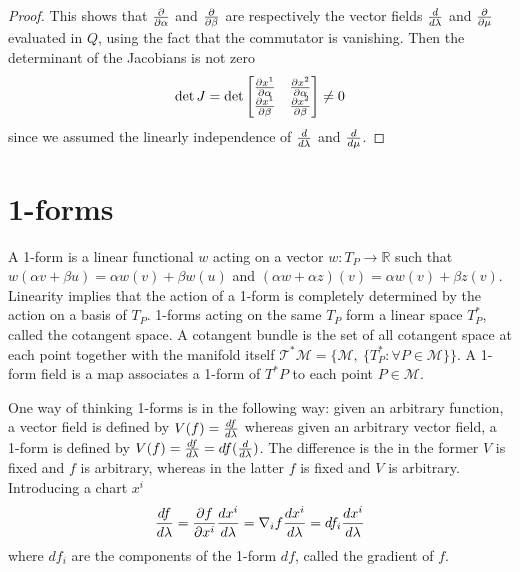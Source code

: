 \begin{proof}
    This shows that $\frac{\partial}{\partial\alpha}$ and $\frac{\partial}{\partial\beta}$ are respectively the vector fields $\frac{d}{d\lambda}$ and $\frac{\partial}{\partial\mu}$ evaluated in $Q$, using the fact that the commutator is vanishing. Then the determinant of the Jacobians is not zero
    \begin{equation*}
        \det J = \det \begin{bmatrix}
            \frac{\partial x^1}{\partial\alpha} & \frac{\partial x^2}{\partial\alpha} \\
            \frac{\partial x^1}{\partial\beta} & \frac{\partial x^2}{\partial\beta} \\
        \end{bmatrix} \neq 0
    \end{equation*}
    since we assumed the linearly independence of $\frac{d}{d\lambda}$ and $\frac{d}{d\mu}$.
    \end{proof} 

\section{1-forms}

    A 1-form is a linear functional $w$ acting on a vector $w \colon T_P \rightarrow \mathbb R$ such that $w(\alpha v + \beta u) = \alpha w(v) + \beta w(u)$ and $(\alpha w + \alpha z)(v) = \alpha w(v) + \beta z(v)$. Linearity implies that the action of a 1-form is completely determined by the action on a basis of $T_P$. 1-forms acting on the same $T_P$ form a linear space $T^*_P$, called the cotangent space. A cotangent bundle is the set of all cotangent space at each point together with the manifold itself $\mathcal T^* \mathcal M = \{\mathcal M, ~\{T^*_P \colon \forall P \in \mathcal M \}\}$. A 1-form field is a map associates a 1-form of $T^*P$ to each point $P \in \mathcal M$.

    One way of thinking 1-forms is in the following way: given an arbitrary function, a vector field is defined by $V(f) = \frac{df}{d\lambda}$ whereas given an arbitrary vector field, a 1-form is defined by $V(f) = \frac{df}{d\lambda} = df (\frac{d}{d\lambda})$. The difference is the in the former $V$ is fixed and $f$ is arbitrary, whereas in the latter $f$ is fixed and $V$ is arbitrary. Introducing a chart $x^i$
    \begin{equation*}
        \frac{df}{d\lambda} = \frac{\partial f}{\partial x^i} \frac{dx^i}{d\lambda} = \nabla_i f \frac{dx^i}{d\lambda} = df_i \frac{dx^i}{d\lambda}
    \end{equation*}
    where $df_i$ are the components of the 1-form $df$, called the gradient of $f$.
    
